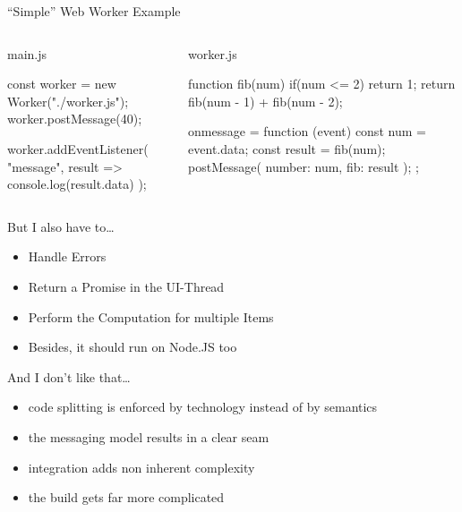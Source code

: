 \begin{frame}[fragile]{\enquote{Simple} Web Worker Example}
	\begin{columns}[t]
		\begin{column}{0.56\textwidth}
			\begin{block}{main.js}
				\begin{javascriptcode}
const worker = new Worker("./worker.js");
worker.postMessage(40);

worker.addEventListener(
	"message", 
	result => console.log(result.data)
);
				\end{javascriptcode}
			\end{block}
		\end{column}
		\pause
		\begin{column}{0.44\textwidth}
			\begin{block}{worker.js}
				\begin{javascriptcode}
function fib(num) {
	if(num <= 2) {
		return 1;
	}
	return fib(num - 1) + fib(num - 2);
}

onmessage = function (event) {
	const num = event.data;
	const result = fib(num);
	postMessage({ 
		number: num, 
		fib: result 
	});
};	
				\end{javascriptcode}
			\end{block}
		\end{column}

	\end{columns}

\end{frame}

\begin{frame}{But I also have to\dots}
	\begin{itemize}
		\item Handle Errors 
		\item Return a Promise in the UI-Thread
		\item Perform the Computation for multiple Items
		\item Besides, it should run on Node.JS too
	\end{itemize}
\end{frame}

\begin{frame}{And I don't like that\dots}
	\begin{itemize}
		\item code splitting is enforced by technology instead of by semantics
		\item the messaging model results in a clear seam 
		\item integration adds non inherent complexity
		\item the build gets far more complicated
	\end{itemize}
\end{frame}